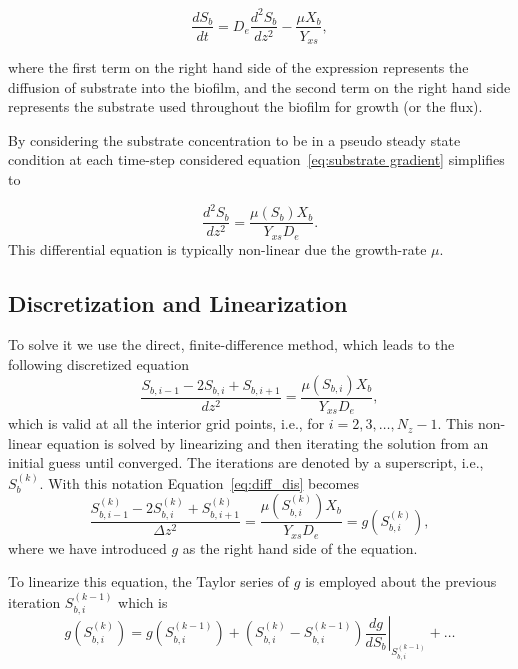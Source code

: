 \documentclass[letterpaper, twoside]{article}
\numberwithin{equation}{section}
\newcommand{\ie}{i.e.}
\begin{document}
\begin{equation} \label{eq:substrate gradient}
\frac{dS_b}{dt} = {D_e}\frac{d^2S_b}{dz^2} - \frac{\mu X_b}{Y_{xs}},
\end{equation}

where the first term on the right hand side of the expression represents the diffusion of substrate into the biofilm, and the second term on the right hand side represents the substrate used throughout the biofilm for growth (or the flux).

By considering the substrate concentration to be in a pseudo steady state condition at each time-step considered equation~\ref {eq:substrate gradient} simplifies to 

\begin{equation} \label{eq:diffusion}
  \frac{d^2 S_b}{dz^2} = \frac{\mu(S_b) X_b}{Y_{xs} D_e}.
\end{equation}
This differential equation is typically non-linear due the growth-rate $\mu$.

\subsection{Discretization and Linearization}
To solve it we use the direct, finite-difference method, which leads to the following discretized equation
\begin{equation} \label{eq:diff_dis}
  \frac{ S_{b,i-1} - 2 S_{b,i} + S_{b,i+1}}{dz^2} = \frac{\mu(S_{b,i}) X_b}{Y_{xs} D_e},
\end{equation}
which is valid at all the interior grid points, \ie, for $i=2,3,\dots,N_z-1$. 
This non-linear equation is solved by linearizing and then iterating the solution from an initial guess until converged.
The iterations are denoted by a superscript, \ie, $S_{b}^{(k)}$.  With this notation Equation~\ref{eq:diff_dis} becomes
\begin{equation} \label{eq:diff_dis_iter}
  \frac{ S_{b,i-1}^{(k)} - 2 S_{b,i}^{(k)} + S_{b,i+1}^{(k)}}{\Delta z^2} = \frac{\mu\left(S_{b,i}^{(k)}\right) X_b}{Y_{xs} D_e} =  g\left(S_{b,i}^{(k)}\right),
\end{equation}
where we have introduced $g$ as the right hand side of the equation.

To linearize this equation, the Taylor series of $g$ is employed about the previous iteration $S_{b,i}^{(k-1)}$ which is
\begin{equation}\label{eq:TaylorSeries}
  g\left(S_{b,i}^{(k)}\right) =   g\left(S_{b,i}^{(k-1)}\right) + \left( S_{b,i}^{(k)} - S_{b,i}^{(k-1)}\right) \left.\frac{d g}{d S_b}\right|_{S_{b,i}^{(k-1)}} + \dots
\end{equation}
\end{document}
